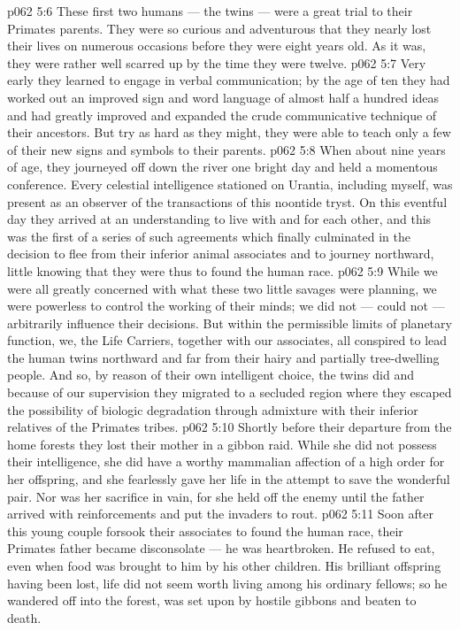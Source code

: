 \vs p062 5:6 These first two humans --- the twins --- were a great trial to their Primates parents. They were so curious and adventurous that they nearly lost their lives on numerous occasions before they were eight years old. As it was, they were rather well scarred up by the time they were twelve.
\vs p062 5:7 Very early they learned to engage in verbal communication; by the age of ten they had worked out an improved sign and word language of almost half a hundred ideas and had greatly improved and expanded the crude communicative technique of their ancestors. But try as hard as they might, they were able to teach only a few of their new signs and symbols to their parents.
\vs p062 5:8 When about nine years of age, they journeyed off down the river one bright day and held a momentous conference. Every celestial intelligence stationed on Urantia, including myself, was present as an observer of the transactions of this noontide tryst. On this eventful day they arrived at an understanding to live with and for each other, and this was the first of a series of such agreements which finally culminated in the decision to flee from their inferior animal associates and to journey northward, little knowing that they were thus to found the human race.
\vs p062 5:9 While we were all greatly concerned with what these two little savages were planning, we were powerless to control the working of their minds; we did not --- could not --- arbitrarily influence their decisions. But within the permissible limits of planetary function, we, the Life Carriers, together with our associates, all conspired to lead the human twins northward and far from their hairy and partially tree\hyp{}dwelling people. And so, by reason of their own intelligent choice, the twins did  and because of our supervision they migrated  to a secluded region where they escaped the possibility of biologic degradation through admixture with their inferior relatives of the Primates tribes.
\vs p062 5:10 Shortly before their departure from the home forests they lost their mother in a gibbon raid. While she did not possess their intelligence, she did have a worthy mammalian affection of a high order for her offspring, and she fearlessly gave her life in the attempt to save the wonderful pair. Nor was her sacrifice in vain, for she held off the enemy until the father arrived with reinforcements and put the invaders to rout.
\vs p062 5:11 Soon after this young couple forsook their associates to found the human race, their Primates father became disconsolate --- he was heartbroken. He refused to eat, even when food was brought to him by his other children. His brilliant offspring having been lost, life did not seem worth living among his ordinary fellows; so he wandered off into the forest, was set upon by hostile gibbons and beaten to death.
